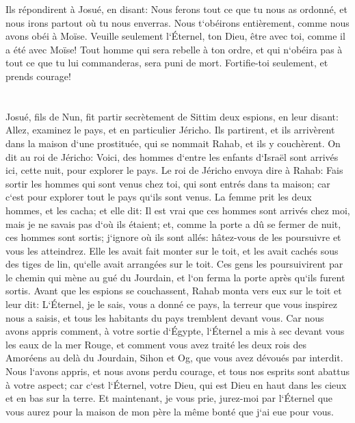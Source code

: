 \verse Ils répondirent à Josué, en disant: Nous ferons tout ce que tu nous as ordonné, et nous irons partout où tu nous enverras. 
\verse Nous t`obéirons entièrement, comme nous avons obéi à Moïse. Veuille seulement l`Éternel, ton Dieu, être avec toi, comme il a été avec Moïse! 
\verse Tout homme qui sera rebelle à ton ordre, et qui n`obéira pas à tout ce que tu lui commanderas, sera puni de mort. Fortifie-toi seulement, et prends courage! 

\chapter{}

\verse Josué, fils de Nun, fit partir secrètement de Sittim deux espions, en leur disant: Allez, examinez le pays, et en particulier Jéricho. Ils partirent, et ils arrivèrent dans la maison d`une prostituée, qui se nommait Rahab, et ils y couchèrent. 
\verse On dit au roi de Jéricho: Voici, des hommes d`entre les enfants d`Israël sont arrivés ici, cette nuit, pour explorer le pays. 
\verse Le roi de Jéricho envoya dire à Rahab: Fais sortir les hommes qui sont venus chez toi, qui sont entrés dans ta maison; car c`est pour explorer tout le pays qu`ils sont venus. 
\verse La femme prit les deux hommes, et les cacha; et elle dit: Il est vrai que ces hommes sont arrivés chez moi, mais je ne savais pas d`où ils étaient; 
\verse et, comme la porte a dû se fermer de nuit, ces hommes sont sortis; j`ignore où ils sont allés: hâtez-vous de les poursuivre et vous les atteindrez. 
\verse Elle les avait fait monter sur le toit, et les avait cachés sous des tiges de lin, qu`elle avait arrangées sur le toit. 
\verse Ces gens les poursuivirent par le chemin qui mène au gué du Jourdain, et l`on ferma la porte après qu`ils furent sortis. 
\verse Avant que les espions se couchassent, Rahab monta vers eux sur le toit 
\verse et leur dit: L`Éternel, je le sais, vous a donné ce pays, la terreur que vous inspirez nous a saisis, et tous les habitants du pays tremblent devant vous. 
\verse Car nous avons appris comment, à votre sortie d`Égypte, l`Éternel a mis à sec devant vous les eaux de la mer Rouge, et comment vous avez traité les deux rois des Amoréens au delà du Jourdain, Sihon et Og, que vous avez dévoués par interdit. 
\verse Nous l`avons appris, et nous avons perdu courage, et tous nos esprits sont abattus à votre aspect; car c`est l`Éternel, votre Dieu, qui est Dieu en haut dans les cieux et en bas sur la terre. 
\verse Et maintenant, je vous prie, jurez-moi par l`Éternel que vous aurez pour la maison de mon père la même bonté que j`ai eue pour vous. 
